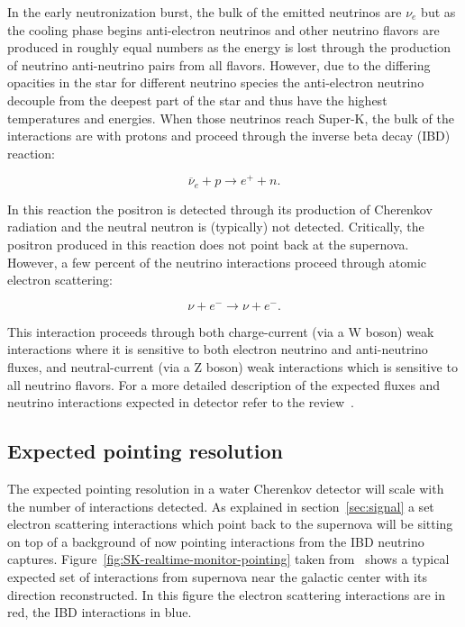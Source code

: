\documentclass[11pt]{article}
\newcommand{\superk}  {Super\nobreakdash-K\xspace}
\begin{document}
In the early neutronization burst, the bulk of the emitted neutrinos
are $\nu_e$ but as the cooling phase begins anti-electron neutrinos
and other neutrino flavors are produced in roughly equal numbers as
the energy is lost through the production of neutrino anti-neutrino
pairs from all flavors.  However, due to the differing opacities in
the star for different neutrino species the anti-electron neutrino
decouple from the deepest part of the star and thus have the highest
temperatures and energies.  When those neutrinos reach \superk, the
bulk of the interactions are with protons and proceed through the
inverse beta decay (IBD) reaction:

$$ \overline{\nu}_{e}+ p \rightarrow e^{+} + n. $$

In this reaction the positron is detected through its production of
Cherenkov radiation and the neutral neutron is (typically) not
detected.  Critically, the positron produced in this reaction does not
point back at the supernova.   However, a few percent of the neutrino interactions proceed
through atomic electron scattering:

$$ \nu + e^{-} \rightarrow \nu + e^{-} .$$

This interaction proceeds through both charge-current (via a W boson)
weak interactions where it is sensitive to both electron neutrino and anti-neutrino
fluxes, and neutral-current (via a Z boson) weak interactions which is
sensitive to all neutrino flavors. For a more detailed description of
the expected fluxes and neutrino interactions expected in detector
refer to the review~\cite{2012ARNPS..62...81S}.

\subsection{Expected pointing resolution}

The expected pointing resolution in a water Cherenkov detector will
scale with the number of interactions detected.  As explained in
section~\ref{sec:signal} a set electron scattering interactions which
point back to the supernova will be sitting on top of a background of
now pointing interactions from the IBD neutrino captures.
Figure~\ref{fig:SK-realtime-monitor-pointing} taken
from~\cite{2016APh....81...39A} shows a typical expected set of
interactions from supernova near the galactic center with its
direction reconstructed.  In this figure the electron scattering
interactions are in red, the IBD interactions in blue.
\end{document}
